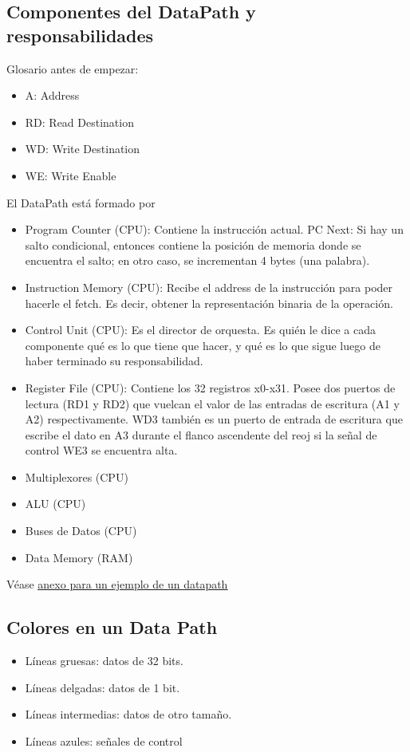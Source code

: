\documentclass[10pt,a4paper]{article}
\begin{document}
\subsection*{Componentes del DataPath y responsabilidades}
Glosario antes de empezar: 
\begin{itemize}
    \item A: Address
    \item RD: Read Destination
    \item WD: Write Destination
    \item WE: Write Enable 
\end{itemize}
El DataPath está formado por
\begin{itemize}
    \item Program Counter (CPU): Contiene la instrucción actual. PC Next: Si hay un salto condicional, entonces contiene la posición de memoria donde se encuentra el salto; en otro caso, se incrementan 4 bytes (una palabra).
    \item Instruction Memory (CPU): Recibe el address de la instrucción para poder hacerle el fetch. Es decir, obtener la representación binaria de la operación.
    \item Control Unit (CPU): Es el director de orquesta. Es quién le dice a cada componente qué es lo que tiene que hacer, y qué es lo que sigue luego de haber terminado su responsabilidad.
    \item Register File (CPU): Contiene los 32 registros x0-x31. Posee dos puertos de lectura (RD1 y RD2) que vuelcan el valor de las entradas de escritura (A1 y A2) respectivamente. WD3 también es un puerto de entrada de escritura que escribe el dato en A3 durante el flanco ascendente del reoj si la señal de control WE3 se encuentra alta.
    \item Multiplexores (CPU)
    \item ALU (CPU)
    \item Buses de Datos (CPU)
    \item Data Memory (RAM)
\end{itemize}
Véase \hyperref[subsec:datapath_example]{\underline{anexo para un ejemplo de un datapath}} 
\subsection*{Colores en un Data Path}
\begin{itemize}
    \item Líneas gruesas: datos de 32 bits.
    \item Líneas delgadas: datos de 1 bit.
    \item Líneas intermedias: datos de otro tamaño.
    \item Líneas azules: señales de control 
\end{itemize}
\end{document}
